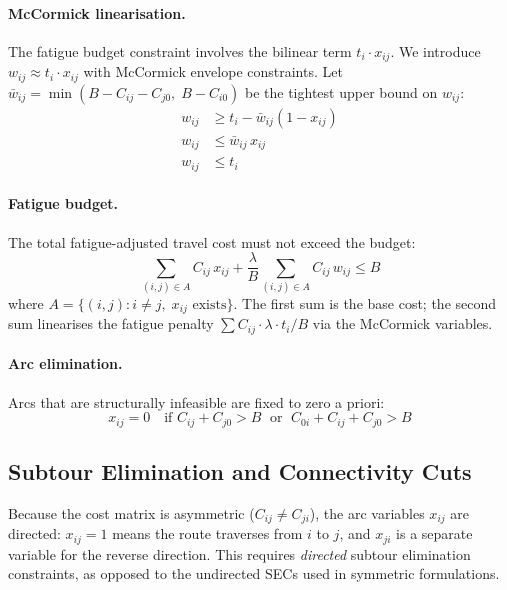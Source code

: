 \documentclass[11pt,a4paper]{article}
\begin{document}
\paragraph{McCormick linearisation.}
The fatigue budget constraint involves the bilinear term $t_i \cdot x_{ij}$.
We introduce $w_{ij} \approx t_i \cdot x_{ij}$ with McCormick envelope constraints.
Let $\bar{w}_{ij} = \min(B - C_{ij} - C_{j0},\; B - C_{i0})$ be the tightest upper bound on $w_{ij}$:
\begin{align}
  w_{ij} &\geq t_i - \bar{w}_{ij}(1 - x_{ij}) \label{eq:mc1} \\
  w_{ij} &\leq \bar{w}_{ij} \, x_{ij} \label{eq:mc2} \\
  w_{ij} &\leq t_i \label{eq:mc3}
\end{align}

\paragraph{Fatigue budget.}
The total fatigue-adjusted travel cost must not exceed the budget:
\begin{equation}
  \sum_{(i,j) \in A} C_{ij} \, x_{ij} + \frac{\lambda}{B} \sum_{(i,j) \in A} C_{ij} \, w_{ij} \leq B
  \label{eq:fatigue_budget}
\end{equation}
where $A = \{(i,j) : i \neq j,\; x_{ij} \text{ exists}\}$.
The first sum is the base cost; the second sum linearises the fatigue penalty $\sum C_{ij} \cdot \lambda \cdot t_i / B$ via the McCormick variables.

\paragraph{Arc elimination.}
Arcs that are structurally infeasible are fixed to zero a priori:
\begin{equation}
  x_{ij} = 0 \quad \text{if } C_{ij} + C_{j0} > B \;\text{ or }\; C_{0i} + C_{ij} + C_{j0} > B
  \label{eq:arcelim}
\end{equation}

\subsection{Subtour Elimination and Connectivity Cuts}

Because the cost matrix is asymmetric ($C_{ij} \neq C_{ji}$), the arc variables $x_{ij}$ are directed: $x_{ij} = 1$ means the route traverses from $i$ to $j$, and $x_{ji}$ is a separate variable for the reverse direction.
This requires \emph{directed} subtour elimination constraints, as opposed to the undirected SECs used in symmetric formulations.
\end{document}
